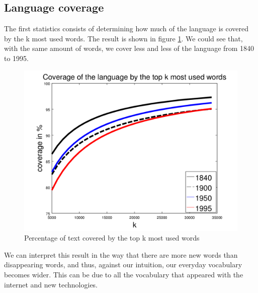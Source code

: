 \subsection{Language coverage}

The first statistics consists of determining how much of the language is covered by the k most used words. The result is shown in figure \ref{coverage_figure}. We could see that, with the same amount of words, we cover less and less of the language from 1840 to 1995.

\begin{figure}[H]
	\centering
    \includegraphics[scale=0.50]{Pictures/statistics/top-k-words-coverage/coverage.png}
    \caption{Percentage of text covered by the top k most used words}
    \label{coverage_figure}
\end{figure}

We can interpret this result in the way that there are more new words than disappearing words, and thus, against our intuition, our everyday vocabulary becomes wider. This can be due to all the vocabulary that appeared with the internet and new technologies.